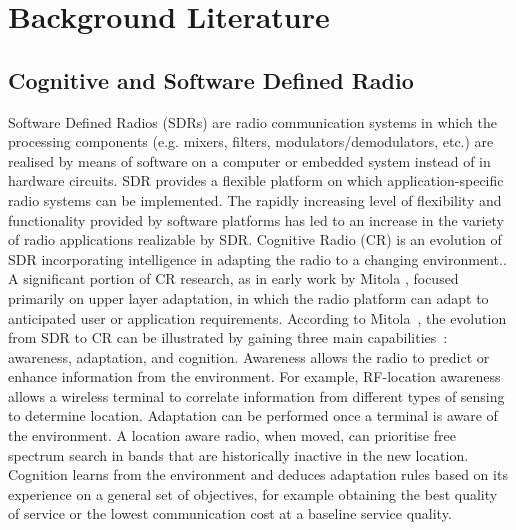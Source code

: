 \chapter{Background Literature}
\label{chap:BackgroundLiterature}

\section{Cognitive and Software Defined Radio}
Software Defined Radios (SDRs) are radio communication systems in which the processing components (e.g. mixers, filters, modulators/demodulators, etc.) are realised by means of software on a computer or embedded system instead of in hardware circuits.
SDR provides a flexible platform on which application-specific radio systems can be implemented. The rapidly increasing level of flexibility and functionality provided by software platforms has led to an increase in the variety of radio applications realizable by SDR.
Cognitive Radio (CR) is an evolution of SDR incorporating intelligence in adapting the radio to a changing environment..
A significant portion of CR research, as in early work by Mitola \cite{Mitola1999}, focused primarily on upper layer adaptation, in which the radio platform can adapt to anticipated user or application requirements.
According to Mitola~\cite{Mitola2006}, the evolution from SDR to CR can be illustrated by gaining three main capabilities~\cite{Recio2010a}: awareness, adaptation, and cognition.
Awareness allows the radio to predict or enhance information from the environment. For example, RF-location awareness allows a wireless terminal to correlate information from different types of sensing to determine location.
Adaptation can be performed once a terminal is aware of the environment. A location aware radio, when moved, can prioritise free spectrum search in bands that are historically inactive in the new location.
Cognition learns from the environment and deduces adaptation rules based on its experience on a general set of objectives, for example obtaining the best quality of service or the lowest communication cost at a baseline service quality.

